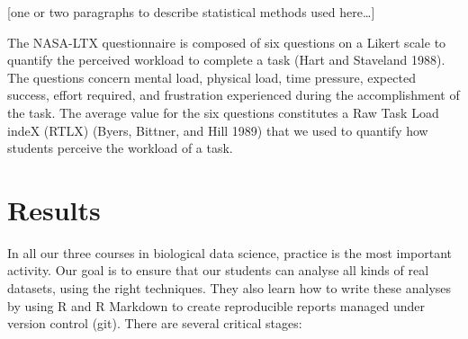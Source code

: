 \documentclass[
]{article}
\begin{document}
{[}one or two paragraphs to describe statistical methods used
here\ldots{]}

The NASA-LTX questionnaire is composed of six questions on a Likert
scale to quantify the perceived workload to complete a task (Hart and
Staveland 1988). The questions concern mental load, physical load, time
pressure, expected success, effort required, and frustration experienced
during the accomplishment of the task. The average value for the six
questions constitutes a Raw Task Load indeX (RTLX) (Byers, Bittner, and
Hill 1989) that we used to quantify how students perceive the workload
of a task.

\hypertarget{results}{%
\section{Results}\label{results}}

In all our three courses in biological data science, practice is the
most important activity. Our goal is to ensure that our students can
analyse all kinds of real datasets, using the right techniques. They
also learn how to write these analyses by using R and R Markdown to
create reproducible reports managed under version control (git). There
are several critical stages:
\end{document}
